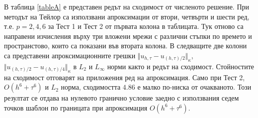 \documentclass{article}
\begin{document}
В таблица \ref{tableA} е представен редът на сходимост от численото решение. При методът на Тейлор са използвани апроксимации от втори, четвърти и шести ред, т.е. $p=2,4,6$ за Тест 1 и Тест 2 от първата колона в таблицата. Тук отново са направени изчисления върху три вложени мрежи с различни стъпки по времето и пространстово, които са показани във втората колона. В следващите две колони са представени апроксимационните грешки  $\Vert u_{h,\tau} - u_{(h,\tau)/2} \Vert_\kappa$, $\Vert  u_{(h,\tau)/2} - u_{(h,\tau)/4} \Vert_\kappa$ в $L_2$ и $L_{\infty}$ норми както и редът на сходимост. Стойностите на сходимост отговарят на приложения ред на апроксимация. Само при Тест 2, $O(h^6 + \tau^6)$ и $L_2$ норма, сходимостта $4.86$ е малко по-ниска от очакваното. Този резултат се отдава на нулевото гранично условие заедно с използвания седем точков шаблон по границата при апроксимация $O(h^6 + \tau^6)$.
\end{document}
